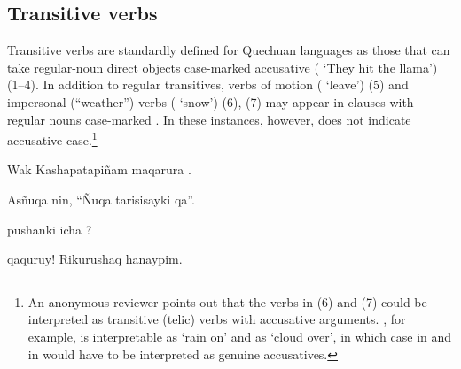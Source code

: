 \subsection{Transitive verbs}\label{sec:transitiveverbs}
Transitive verbs are standardly defined for Quechuan languages as those that can take regular-noun direct objects case-marked accusative (  `They hit the llama') (1--4). In addition to regular transitives, verbs of motion ( `leave') (5) and impersonal (``weather'') verbs ( `snow') (6), (7) may appear in clauses with regular nouns case-marked . In these instances, however,  does not indicate accusative case.\footnote{An anonymous reviewer points out that the verbs in (6) and (7) could be interpreted as transitive (telic) verbs with accusative arguments. , for example, is interpretable as `rain on' and  as `cloud over', in which case  in  and in  would have to be interpreted as genuine accusatives.}

%
{Wak Kashapatapi\~nam maqarura .}%
{}%
{}{}%

%
{As\~nuqa nin, ``\~Nuqa tarisisayki qa''.}%
{}%
{}{}%

%
{\textquestiondown{} pushanki icha ?}%
{}%
{}{}%

%
{\textexclamdown{}  qaquruy! Rikurushaq hanaypim.}%
{}%
{}{}%

